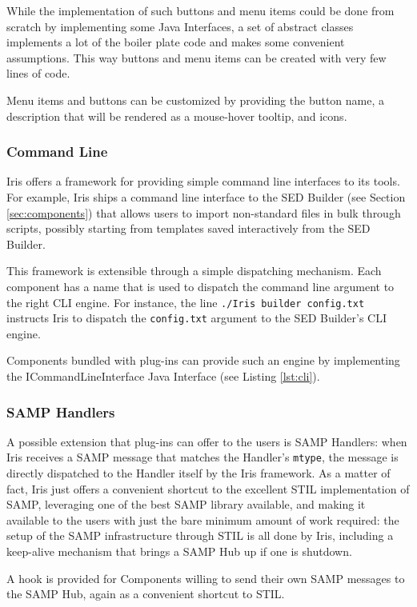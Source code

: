 While the implementation of such buttons and menu items could be done from scratch by implementing some Java Interfaces, a set of abstract classes implements a lot of the boiler plate code and makes some convenient assumptions. This way buttons and menu items can be created with very few lines of code.

Menu items and buttons can be customized by providing the button name, a description that will be rendered as a mouse-hover tooltip, and icons.

\subsubsection{Command Line}
Iris offers a framework for providing simple command line interfaces to its tools. For example, Iris ships a command line interface to the SED Builder (see Section \ref{sec:components}) that allows users to import non-standard files in bulk through scripts, possibly starting from templates saved interactively from the SED Builder.

This framework is extensible through a simple dispatching mechanism. Each component has a name that is used to dispatch the command line argument to the right CLI engine. For instance, the line \verb|./Iris builder config.txt| instructs Iris to dispatch the \verb|config.txt| argument to the SED Builder's CLI engine.

Components bundled with plug-ins can provide such an engine by implementing the ICommandLineInterface Java Interface (see Listing \ref{lst:cli}).

\subsubsection{SAMP Handlers}
A possible extension that plug-ins can offer to the users is SAMP Handlers: when Iris receives a SAMP message that matches the Handler's \verb|mtype|, the message is directly dispatched to the Handler itself by the Iris framework. As a matter of fact, Iris just offers a convenient shortcut to the excellent STIL implementation of SAMP, leveraging one of the best SAMP library available, and making it available to the users with just the bare minimum amount of work required: the setup of the SAMP infrastructure through STIL is all done by Iris, including a keep-alive mechanism that brings a SAMP Hub up if one is shutdown.

A hook is provided for Components willing to send their own SAMP messages to the SAMP Hub, again as a convenient shortcut to STIL.

